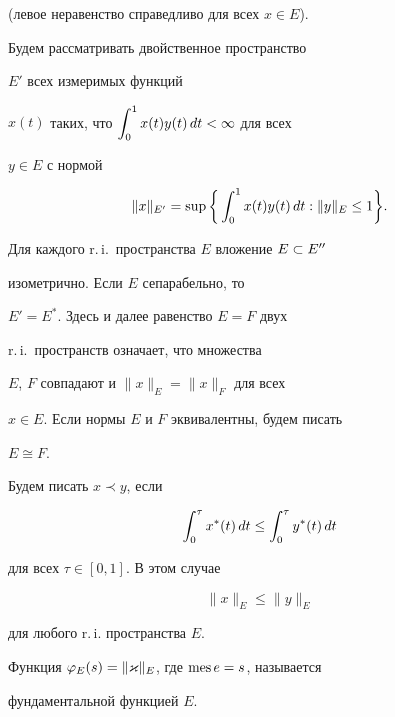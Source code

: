 (левое неравенство справедливо для всех $x\in E$). 





Будем рассматривать двойственное пространство


$E'$ всех измеримых функций


$x(t)$ таких, что $\displaystyle\int_{0}^{1} x(t) y(t) \, dt < \infty$ для всех


$y\in E$ с нормой


$$




\|x\|_{E'} = \sup \bigg\{ \intl{0}{1} x(t) y(t) \, dt : \|y\|_E\le 1


\bigg\}. 




$$


Для каждого r.\,i.\ пространства $E$ вложение $E \subset E''$ 


изометрично. Если $E$ сепарабельно, то


$E' = E^*$. Здесь и далее равенство $E=F$ двух 


r.\,i.\ пространств означает, что множества


$E$, $F$ совпадают и $\|x\|_E = \|x\|_F$ для всех


$x\in E$. Если нормы $E$ и $F$ эквивалентны, будем писать


$E \cong F$. 





Будем писать $x\prec y$, если


$$


\intl{0}{\tau} x^* (t)\, dt \le \intl{0}{\tau} y^* (t)\, dt


$$


для всех $\tau \in [0,1]$. В этом случае


\begin{equation}\label{e6}


\|x\|_E \le \|y\|_E


\end{equation} 


для любого r.\,i. пространства $E$. 





Функция $\varphi_E(s) = \|\varkappa\|_E$, где $\operatorname{mes} e = s$, называется 


фундаментальной функцией $E$. 





